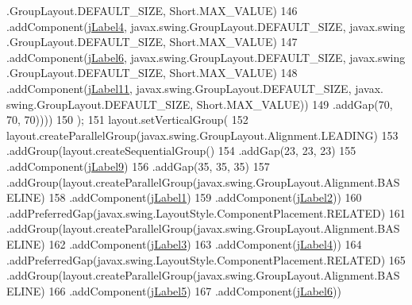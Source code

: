\begin{DoxyCode}
      .GroupLayout.DEFAULT\_SIZE, Short.MAX\_VALUE)
146                             .addComponent(\mbox{\hyperlink{class_interfaz_package_1_1_verificar_lector_a62bbde18899ef9256baedfe4b9356420}{jLabel4}}, javax.swing.GroupLayout.DEFAULT\_SIZE, javax.swing
      .GroupLayout.DEFAULT\_SIZE, Short.MAX\_VALUE)
147                             .addComponent(\mbox{\hyperlink{class_interfaz_package_1_1_verificar_lector_a6f0c74ae426505ab6ed81776821a97ee}{jLabel6}}, javax.swing.GroupLayout.DEFAULT\_SIZE, javax.swing
      .GroupLayout.DEFAULT\_SIZE, Short.MAX\_VALUE)
148                             .addComponent(\mbox{\hyperlink{class_interfaz_package_1_1_verificar_lector_ae75078bb58455233a13a76d47cca166b}{jLabel11}}, javax.swing.GroupLayout.DEFAULT\_SIZE, javax.
      swing.GroupLayout.DEFAULT\_SIZE, Short.MAX\_VALUE))
149                         .addGap(70, 70, 70))))
150         );
151         layout.setVerticalGroup(
152             layout.createParallelGroup(javax.swing.GroupLayout.Alignment.LEADING)
153             .addGroup(layout.createSequentialGroup()
154                 .addGap(23, 23, 23)
155                 .addComponent(\mbox{\hyperlink{class_interfaz_package_1_1_verificar_lector_a6b89cc82be1dfb55e197733ceb9f8455}{jLabel9}})
156                 .addGap(35, 35, 35)
157                 .addGroup(layout.createParallelGroup(javax.swing.GroupLayout.Alignment.BASELINE)
158                     .addComponent(\mbox{\hyperlink{class_interfaz_package_1_1_verificar_lector_a94dfc256ea6a29f49c233c3fec52ac7d}{jLabel1}})
159                     .addComponent(\mbox{\hyperlink{class_interfaz_package_1_1_verificar_lector_afe825b210747901c7fe1977911da0ae4}{jLabel2}}))
160                 .addPreferredGap(javax.swing.LayoutStyle.ComponentPlacement.RELATED)
161                 .addGroup(layout.createParallelGroup(javax.swing.GroupLayout.Alignment.BASELINE)
162                     .addComponent(\mbox{\hyperlink{class_interfaz_package_1_1_verificar_lector_ad3a983dda4f171c69b407375acaf226d}{jLabel3}})
163                     .addComponent(\mbox{\hyperlink{class_interfaz_package_1_1_verificar_lector_a62bbde18899ef9256baedfe4b9356420}{jLabel4}}))
164                 .addPreferredGap(javax.swing.LayoutStyle.ComponentPlacement.RELATED)
165                 .addGroup(layout.createParallelGroup(javax.swing.GroupLayout.Alignment.BASELINE)
166                     .addComponent(\mbox{\hyperlink{class_interfaz_package_1_1_verificar_lector_a1023d3021f65695047c7e5bc41613e09}{jLabel5}})
167                     .addComponent(\mbox{\hyperlink{class_interfaz_package_1_1_verificar_lector_a6f0c74ae426505ab6ed81776821a97ee}{jLabel6}}))

\end{DoxyCode}
